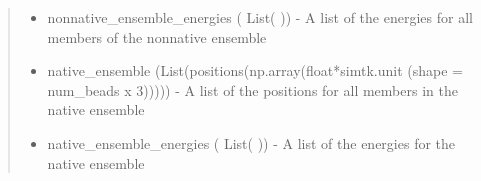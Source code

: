 \documentclass[letterpaper,12pt,english,openany,oneside]{sphinxmanual}
\begin{document}
\begin{fulllineitems}
\begin{quote}
\begin{description}
\begin{itemize}
\item {} 
nonnative\_ensemble\_energies ( List( )) - A list of the energies for all members of the nonnative ensemble

\item {} 
native\_ensemble (List(positions(np.array(float*simtk.unit (shape = num\_beads x 3))))) - A list of the positions for all members in the native ensemble

\item {} 
native\_ensemble\_energies ( List( )) - A list of the energies for the native ensemble

\end{itemize}


\end{description}\end{quote}

\end{fulllineitems}

\end{document}
